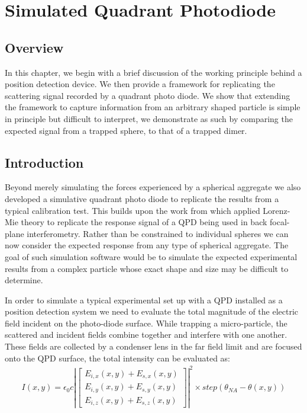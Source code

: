\chapter{Simulated Quadrant Photodiode}
\label{chapter:simulated_QPD}

\section{Overview}
In this chapter, we begin with a brief discussion of the working 
principle behind a position detection device. We then provide a 
framework for replicating the scattering signal recorded by a 
quadrant photo diode. We show that extending the framework to 
capture information from an arbitrary shaped particle is simple 
in principle but difficult to interpret, we demonstrate as such 
by comparing the expected signal from a trapped sphere, to that 
of a trapped dimer.

\section{Introduction}

Beyond merely simulating the forces experienced by a spherical 
aggregate we also developed a simulative quadrant photo diode 
to replicate the results from a typical calibration test. This 
builds upon the work from \cite{Rohrbach2002} which applied 
Lorenz-Mie theory to replicate the response signal of a QPD 
being used in back focal-plane interferometry. Rather than be 
constrained to individual spheres we can now consider the 
expected response from any type of spherical aggregate. The
goal of such simulation software would be to simulate the 
expected experimental results from a complex particle whose 
exact shape and size may be difficult to determine. 

In order to simulate a typical experimental set up with a QPD 
installed as a position detection system we need to evaluate 
the total magnitude of the electric field incident on the 
photo-diode surface. While trapping a micro-particle, the 
scattered and incident fields combine together and interfere 
with one another. These fields are collected by a condenser 
lens in the far field limit and are focused onto the QPD 
surface, the total intensity can be evaluated as:
\begin{align}
	I(x,y) = \epsilon_0c\left|
	\begin{bmatrix} 
		E_{i,x}(x,y)+E_{s,x}(x,y) \\ 
		E_{i,y}(x,y)+E_{s,y}(x,y) \\ 
		E_{i,z}(x,y)+E_{s,z}(x,y)
	\end{bmatrix} \right|^2 \times step(\theta_{NA}-\theta(x,y))
\end{align}

